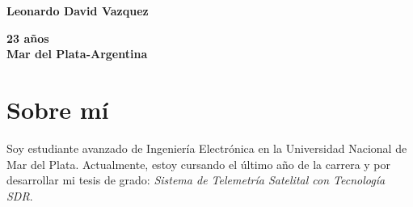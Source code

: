 \documentclass[a4paper,10pt]{article}
\begin{document}
\thispagestyle{empty}

\begin{adjustbox}{valign=t}
\begin{minipage}{0.34\textwidth} 
\begin{center}
\MySkip 	%
{\LARGE \bfseries Leonardo David Vazquez}
\MySkip 	%
\end{center}
\centering
\textbf{23 años}\\
\textbf{Mar del Plata-Argentina }\MySkip
\raggedright
\textcolor{ColorRed}{\faEnvelopeO} 

\textcolor{ColorRed}{\faLinkedin} 

\textcolor{ColorRed}{\faGithub} 


\section*{Sobre mí}
\begin{center}
\justifying
    Soy estudiante avanzado de Ingeniería Electrónica en la Universidad Nacional de Mar del Plata. Actualmente, estoy cursando el último año de la carrera y por desarrollar mi tesis de grado: {\it Sistema de Telemetría Satelital con Tecnología SDR}.
\end{center}


\end{minipage}
\end{adjustbox}
\end{document}
